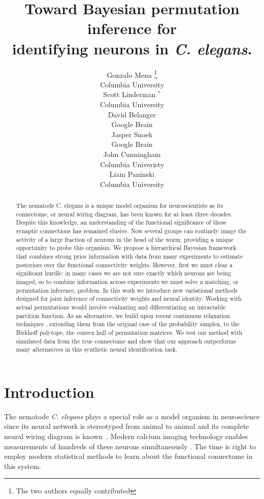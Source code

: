\documentclass{article}
\title{Toward Bayesian permutation inference for \\identifying neurons in \textit{C. elegans}.}
\author{
  Gonzalo Mena \thanks{The two authors equally contributed} \\
  Columbia University\\
   \And
  Scott Linderman  $^{*}$ \\
  Columbia University \\
   \AND
  David Belanger\\
  Google Brain \\
  \And
  Jasper Snoek\\
  Google Brain \\
  \And
  John Cunningham\\
  Columbia Univeristy \\
   \And
  Liam Paninski \\
  Columbia University\\
}
\begin{document}

\maketitle

\begin{abstract}
  The nematode C. elegans is a unique model organism for
  neuroscientists as its connectome, or neural wiring diagram, has
  been known for at least three decades. Despite this knowledge, an
  understanding of the functional significance of these synaptic
  connections has remained elusive. Now several groups can routinely
  image the activity of a large fraction of neurons in the head of the
  worm, providing a unique opportunity to probe this organism. We
  propose a hierarchical Bayesian framework that combines strong prior
  information with data from many experiments to estimate posteriors
  over the functional connectivity weights. However, first we must
  clear a significant hurdle: in many cases we are not sure
  exactly which neurons are being imaged, so to combine information
  across experiments we must solve a matching, or permutation
  inference, problem. In this work we introduce new variational
  methods designed for joint inference of connectivity weights and
  neural identity. Working with actual permutations would involve
  evaluating and differentiating an intractable partition function. As
  an alternative, we build upon recent continuous relaxation
  techniques \citep{Jang2016, Maddison2016}, extending them from the
  original case of the probability simplex, to the Birkhoff polytope,
  the convex hull of permutation matrices. We test our method with
  simulated data from the true connectome and show that our approach
  outperforms many alternatives in this synthetic neural identification task.
\end{abstract}



\section{Introduction}
The nematode \textit{C. elegans} plays a special role as a model
organism in neuroscience since its neural network is stereotyped from
animal to animal and its complete neural wiring diagram is
known~\citep{varshney2011structural}.  Modern calcium imaging
technology enables measurements of hundreds of these neurons
simultaneously \citep{Kato2015, nguyen2016whole}. The time is
right to employ modern statistical methods to learn about the
functional connectome in this system.
\end{document}
